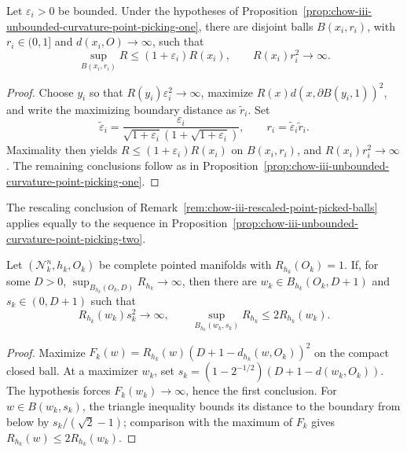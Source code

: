 \begin{proposition}
\label{prop:chow-iii-unbounded-curvature-point-picking-two}
Let \(\varepsilon_i>0\) be bounded.  Under the hypotheses of
Proposition~\ref{prop:chow-iii-unbounded-curvature-point-picking-one}, there
are disjoint balls \(B(x_i,r_i)\), with \(r_i\in(0,1]\) and
\(d(x_i,O)\to\infty\), such that
\[
 \sup_{B(x_i,r_i)}R\le(1+\varepsilon_i)R(x_i),
 \qquad R(x_i)r_i^2\to\infty.
\]
\end{proposition}
\begin{proof}
Choose \(y_i\) so that \(R(y_i)\varepsilon_i^2\to\infty\), maximize
\(R(x)d(x,\partial B(y_i,1))^2\), and write the maximizing boundary distance
as \(\widetilde r_i\).  Set
\[
 \widetilde\varepsilon_i=
 \frac{\varepsilon_i}{\sqrt{1+\varepsilon_i}(1+\sqrt{1+\varepsilon_i})},
 \qquad r_i=\widetilde\varepsilon_i\widetilde r_i.
\]
Maximality then yields \(R\le(1+\varepsilon_i)R(x_i)\) on \(B(x_i,r_i)\),
and \(R(x_i)r_i^2\to\infty\).  The remaining conclusions follow as in
Proposition~\ref{prop:chow-iii-unbounded-curvature-point-picking-one}.
\end{proof}

\begin{remark}
\label{rem:chow-iii-improved-point-picking-rescaling}
The rescaling conclusion of
Remark~\ref{rem:chow-iii-rescaled-point-picked-balls} applies equally to the
sequence in Proposition~\ref{prop:chow-iii-unbounded-curvature-point-picking-two}.
\end{remark}

\begin{lemma}
\label{lem:chow-iii-point-picking-unbounded-change}
Let \((\mathcal N_k^n,h_k,O_k)\) be complete pointed manifolds with
\(R_{h_k}(O_k)=1\).  If, for some \(D>0\),
\(\sup_{B_{h_k}(O_k,D)}R_{h_k}\to\infty\), then there are
\(w_k\in B_{h_k}(O_k,D+1)\) and \(s_k\in(0,D+1)\) such that
\[
 R_{h_k}(w_k)s_k^2\to\infty,
 \qquad \sup_{B_{h_k}(w_k,s_k)}R_{h_k}\le2R_{h_k}(w_k).
\]
\end{lemma}
\begin{proof}
Maximize
\(F_k(w)=R_{h_k}(w)(D+1-d_{h_k}(w,O_k))^2\) on the compact closed ball.
At a maximizer \(w_k\), set
\(s_k=(1-2^{-1/2})(D+1-d(w_k,O_k))\).  The hypothesis forces
\(F_k(w_k)\to\infty\), hence the first conclusion.  For
\(w\in B(w_k,s_k)\), the triangle inequality bounds its distance to the
boundary from below by \(s_k/(\sqrt2-1)\); comparison with the maximum of
\(F_k\) gives \(R_{h_k}(w)\le2R_{h_k}(w_k)\).
\end{proof}

